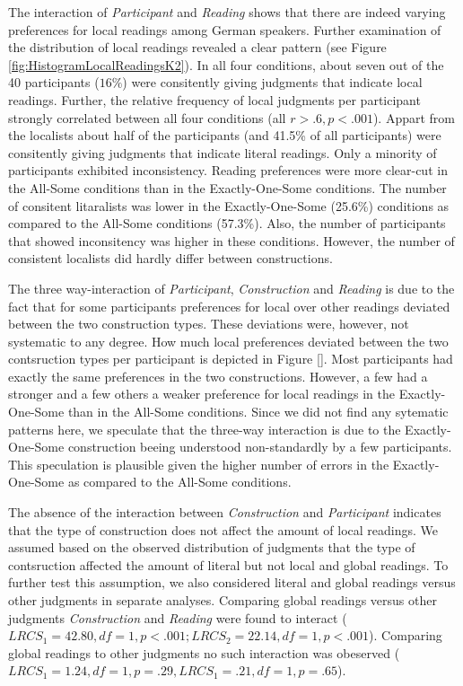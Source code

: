 \documentclass[a4paper,10pt]{article}
\begin{document}
The interaction of {\it Participant} and {\it Reading} shows that there are indeed varying preferences for local readings among German speakers. Further examination of the distribution of local readings revealed a clear pattern (see Figure \ref{fig:HistogramLocalReadingsK2}). In all four conditions, about  seven out of the 40 participants ($16\%$)  were consitently giving judgments that indicate local readings. Further, the relative frequency of local judgments per participant strongly correlated between all four conditions (all $r>.6, p<.001$). Appart from the localists about half of the participants (and 41.5\% of all participants) were consitently giving judgments that indicate literal readings. Only a minority of participants exhibited inconsistency. Reading preferences were  more clear-cut in the All-Some conditions than in the Exactly-One-Some conditions. The number of consitent litaralists was lower in the Exactly-One-Some (25.6\%) conditions as compared to the All-Some conditions (57.3\%). Also, the number of participants that showed inconsitency was higher in these conditions. However, the number of consistent localists did hardly differ between constructions.  

The three way-interaction of {\it Participant}, {\it Construction} and {\it Reading} is due to the fact that for some participants preferences for local over other readings deviated between the two construction types. These deviations were, however, not systematic to any degree. How much local preferences deviated between the two contsruction types per participant is depicted in Figure \ref{}. Most participants had exactly the same preferences in the two constructions. However, a few had a stronger and a few others a weaker preference for local readings in the Exactly-One-Some than in the All-Some conditions. Since we did not find any sytematic patterns here, we speculate that the three-way interaction is due to the Exactly-One-Some construction beeing understood non-standardly by a few participants. This speculation is plausible given the higher number of errors in the Exactly-One-Some  as compared to the All-Some conditions.   

The absence of the interaction between {\it Construction} and {\it Participant} indicates that the type of construction does not affect the amount of local readings. We assumed based on the observed distribution of judgments that the type of contsruction affected the amount of literal but not local and global readings. To further test this assumption, we also considered literal and global readings versus other judgments in separate analyses. Comparing global readings versus other judgments {\it Construction} and {\it Reading} were found to interact ($LRCS_1=42.80, df= 1, p<.001; LRCS_2=22.14, df= 1, p<.001$). Comparing global readings to other judgments no such interaction was obeserved ($LRCS_1=1.24, df= 1, p=.29, LRCS_1=.21, df= 1, p=.65$).
\end{document}
